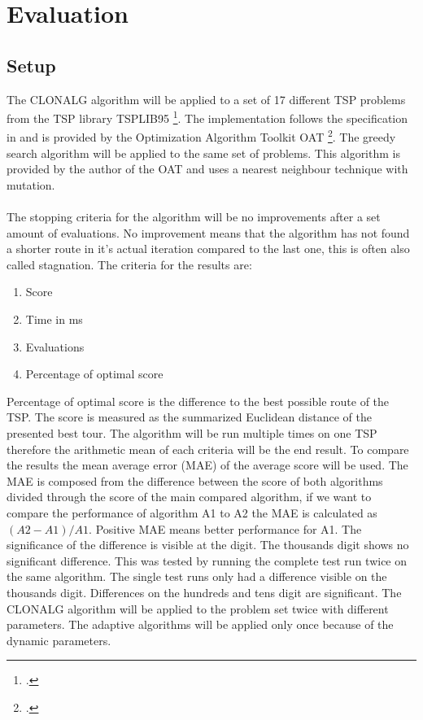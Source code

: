 \chapter{Evaluation}
\label{chap:eva}
\section{Setup}
The CLONALG algorithm will be applied to a set of 17 different TSP problems from the TSP library TSPLIB95 \footcite[https://www.iwr.uni-heidelberg.de/groups/comopt/software/TSPLIB95/]{tsplib}. The implementation follows the specification in \cite{DEC02} and is provided by the Optimization Algorithm Toolkit OAT \footcite[http://optalgtoolkit.sourceforge.net/]{oat}. The greedy search algorithm will be applied to the same set of problems. This algorithm is provided by the author of the OAT and uses a nearest neighbour technique with mutation.\\\\ 
The stopping criteria for the algorithm will be no improvements after a set amount of evaluations. No improvement means that the algorithm has not found a shorter route in it's actual iteration compared to the last one, this is often also called stagnation. 
The criteria for the results are:
\begin{enumerate}
	\item 	Score
	\item 	Time in ms
	\item 	Evaluations	
	\item  	Percentage of optimal score
\end{enumerate}
Percentage of optimal score is the difference to the best possible route of the TSP. The score is measured as the summarized Euclidean distance of the presented best tour. The algorithm will be run multiple times on one TSP therefore the arithmetic mean of each criteria will be the end result. To compare the results the mean average error (MAE) of the average score will be used. The MAE is composed from the difference between the score of both algorithms divided through the score of the main compared algorithm, if we want to compare the performance of algorithm A1 to A2 the MAE is calculated as $(A2-A1)/A1$. Positive MAE means better performance for A1. The significance of the difference is visible at the digit. The thousands digit shows no significant difference. This was tested by running the complete test run twice on the same algorithm. The single test runs only had a difference visible on the thousands digit. Differences on the hundreds and tens digit are significant. The CLONALG algorithm will be applied to the problem set twice with different parameters. The adaptive algorithms will be applied only once because of the dynamic parameters.
